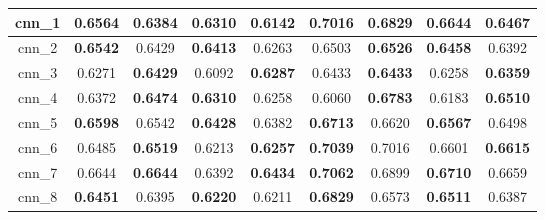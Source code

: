 \begin{table}[p]
\begin{tabular}{|c|c|c|c|c|c|c|c|c|}
        cnn\_1   & \textbf{0.6564}                     & 0.6384                              & \textbf{0.6310}                     & 0.6142                              & \textbf{0.7016}                     & 0.6829                              & \textbf{0.6644}                     & 0.6467                              \\ \hline
        cnn\_2   & \textbf{0.6542}                     & 0.6429                              & \textbf{0.6413}                     & 0.6263                              & 0.6503                              & \textbf{0.6526}                     & \textbf{0.6458}                     & 0.6392                              \\ \hline
        cnn\_3   & 0.6271                              & \textbf{0.6429}                     & 0.6092                              & \textbf{0.6287}                     & 0.6433                              & \textbf{0.6433}                     & 0.6258                              & \textbf{0.6359}                     \\ \hline
        cnn\_4   & 0.6372                              & \textbf{0.6474}                     & \textbf{0.6310}                     & 0.6258                              & 0.6060                              & \textbf{0.6783}                     & 0.6183                              & \textbf{0.6510}                     \\ \hline
        cnn\_5   & \textbf{0.6598}                     & 0.6542                              & \textbf{0.6428}                     & 0.6382                              & \textbf{0.6713}                     & 0.6620                              & \textbf{0.6567}                     & 0.6498                              \\ \hline
        cnn\_6   & 0.6485                              & \textbf{0.6519}                     & 0.6213                              & \textbf{0.6257}                     & \textbf{0.7039}                     & 0.7016                              & 0.6601                              & \textbf{0.6615}                     \\ \hline
        cnn\_7   & 0.6644                              & \textbf{0.6644}                     & 0.6392                              & \textbf{0.6434}                     & \textbf{0.7062}                     & 0.6899                              & \textbf{0.6710}                     & 0.6659                              \\ \hline
        cnn\_8   & \textbf{0.6451}                     & 0.6395                              & \textbf{0.6220}                     & 0.6211                              & \textbf{0.6829}                     & 0.6573                              & \textbf{0.6511}                     & 0.6387                              \\ \hline

\end{tabular}
\end{table}
